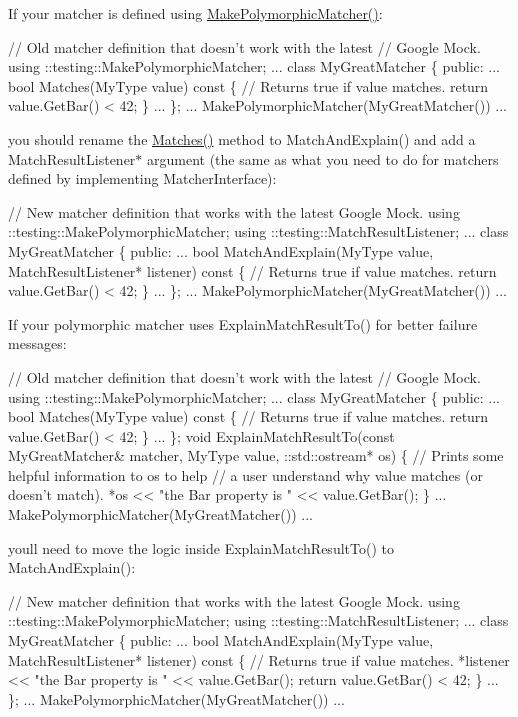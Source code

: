 If your matcher is defined using {\ttfamily \hyperlink{namespacetesting_a667ca94f190ec2e17ee2fbfdb7d3da04}{Make\+Polymorphic\+Matcher()}}\+: 
\begin{DoxyCode}
// Old matcher definition that doesn't work with the latest
// Google Mock.
using ::testing::MakePolymorphicMatcher;
...
class MyGreatMatcher \{
 public:
  ...
  bool Matches(MyType value) const \{
    // Returns true if value matches.
    return value.GetBar() < 42;
  \}
  ...
\};
... MakePolymorphicMatcher(MyGreatMatcher()) ...
\end{DoxyCode}


you should rename the {\ttfamily \hyperlink{namespacetesting_ad53b509ae9cd51040d67f668f99702ae}{Matches()}} method to {\ttfamily Match\+And\+Explain()} and add a {\ttfamily Match\+Result\+Listener$\ast$} argument (the same as what you need to do for matchers defined by implementing {\ttfamily Matcher\+Interface})\+: 
\begin{DoxyCode}
// New matcher definition that works with the latest Google Mock.
using ::testing::MakePolymorphicMatcher;
using ::testing::MatchResultListener;
...
class MyGreatMatcher \{
 public:
  ...
  bool MatchAndExplain(MyType value,
                       MatchResultListener* listener) const \{
    // Returns true if value matches.
    return value.GetBar() < 42;
  \}
  ...
\};
... MakePolymorphicMatcher(MyGreatMatcher()) ...
\end{DoxyCode}


If your polymorphic matcher uses {\ttfamily Explain\+Match\+Result\+To()} for better failure messages\+: 
\begin{DoxyCode}
// Old matcher definition that doesn't work with the latest
// Google Mock.
using ::testing::MakePolymorphicMatcher;
...
class MyGreatMatcher \{
 public:
  ...
  bool Matches(MyType value) const \{
    // Returns true if value matches.
    return value.GetBar() < 42;
  \}
  ...
\};
void ExplainMatchResultTo(const MyGreatMatcher& matcher,
                          MyType value,
                          ::std::ostream* os) \{
  // Prints some helpful information to os to help
  // a user understand why value matches (or doesn't match).
  *os << "the Bar property is " << value.GetBar();
\}
... MakePolymorphicMatcher(MyGreatMatcher()) ...
\end{DoxyCode}


you\textquotesingle{}ll need to move the logic inside {\ttfamily Explain\+Match\+Result\+To()} to {\ttfamily Match\+And\+Explain()}\+: 
\begin{DoxyCode}
// New matcher definition that works with the latest Google Mock.
using ::testing::MakePolymorphicMatcher;
using ::testing::MatchResultListener;
...
class MyGreatMatcher \{
 public:
  ...
  bool MatchAndExplain(MyType value,
                       MatchResultListener* listener) const \{
    // Returns true if value matches.
    *listener << "the Bar property is " << value.GetBar();
    return value.GetBar() < 42;
  \}
  ...
\};
... MakePolymorphicMatcher(MyGreatMatcher()) ...
\end{DoxyCode}


